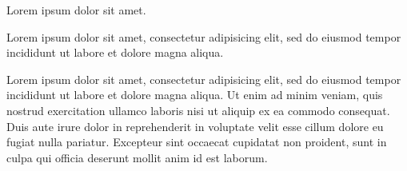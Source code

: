 \documentclass[a5paper]{jsbook}
\begin{document}
\begin{multipagebox}
Lorem ipsum dolor sit amet.
\end{multipagebox}

\begin{multipagebox}
Lorem ipsum dolor sit amet, consectetur adipisicing elit, sed do
eiusmod tempor incididunt ut labore et dolore magna aliqua. 
\end{multipagebox}

Lorem ipsum dolor sit amet, consectetur adipisicing elit, sed do
eiusmod tempor incididunt ut labore et dolore magna aliqua. Ut enim ad
minim veniam, quis nostrud exercitation ullamco laboris nisi ut
aliquip ex ea commodo consequat. Duis aute irure dolor in
reprehenderit in voluptate velit esse cillum dolore eu fugiat nulla
pariatur. Excepteur sint occaecat cupidatat non proident, sunt in
culpa qui officia deserunt mollit anim id est laborum.
\end{document}
